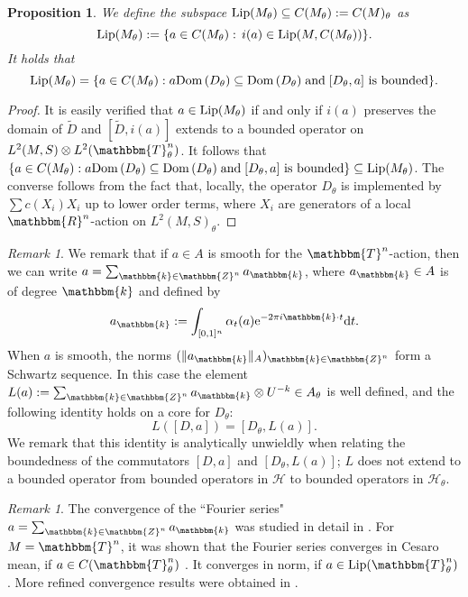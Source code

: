 \documentclass[10pt]{amsart}
\newtheorem{prop}[thm]{Proposition}
\theoremstyle{remark}
\newtheorem{remark}[thm]{Remark}
\theoremstyle{definition}
\begin{document}
\begin{prop}
We define the subspace ${\textnormal{Lip}}(M_\theta)\subseteq C(M_\theta):=C(M)_\theta$ as 
$${\textnormal{Lip}}(M_\theta):=\{a\in C(M_\theta): \,i(a)\in {\textnormal{Lip}}(M,C(M_\theta))\}.$$
It holds that 
$${\textnormal{Lip}}(M_\theta)=\{a\in C(M_\theta):a{\mathrm{Dom}\,}(D_\theta)\subseteq {\mathrm{Dom}\,}(D_\theta)\;\mbox{and} \; [D_\theta,a]\mbox{ is bounded}\}.$$
\end{prop}

\begin{proof}
It is easily verified that $a\in {\textnormal{Lip}}(M_\theta)$ if and only if $i(a)$ preserves the domain of $\tilde{D}$ and $[\tilde{D},i(a)]$ extends to a bounded operator on $L^2(M,S)\otimes L^2({\mathbbm{T}}^n_\theta)$. It follows that $\{a\in C(M_\theta):a{\mathrm{Dom}\,}(D_\theta)\subseteq {\mathrm{Dom}\,}(D_\theta)\;\mbox{and} \; [D_\theta,a]\mbox{ is bounded}\}\subseteq {\textnormal{Lip}}(M_\theta)$. The converse follows from the fact that,  locally, the operator $D_\theta$ is implemented by $\sum c(X_i)X_i$ up to lower order terms, where $X_i$ are generators of a local ${\mathbbm{R}}^n$-action on $L^2(M,S)_\theta$. 
\end{proof}

\begin{remark}
\label{thelmapping}
We remark that if $a\in A$ is smooth for the ${\mathbbm{T}}^n$-action, then we can write $a=\sum_{\mathbbm{k}\in {\mathbbm{Z}}^n} a_\mathbbm{k}$, where $a_\mathbbm{k}\in A$ is of degree $\mathbbm{k}$ and defined by 
$$a_\mathbbm{k}:=\int_{[0,1]^n} \alpha_t(a){\mathrm{e}}^{-2\pi i\mathbbm{k}\cdot t}{\mathrm{d}} t.$$
When $a$ is smooth, the norms $(\|a_\mathbbm{k}\|_A)_{\mathbbm{k}\in {\mathbbm{Z}}^n}$ form a Schwartz sequence. In this case the element $L(a):=\sum_{\mathbbm{k}\in {\mathbbm{Z}}^n} a_\mathbbm{k}\otimes U^{-k}\in A_\theta$ is well defined, and the following identity holds on a core for $D_\theta$:
$$L([D,a])=[D_\theta,L(a)].$$
We remark that this identity is analytically unwieldly when relating the boundedness of the commutators $[D,a]$ and $[D_\theta,L(a)]$; $L$ does not extend to a bounded operator from bounded operators in ${\mathcal{H}}$ to bounded operators in ${\mathcal{H}}_\theta$.
\end{remark}

\begin{remark}
The convergence of the ``Fourier series"  $a=\sum_{\mathbbm{k}\in {\mathbbm{Z}}^n} a_\mathbbm{k}$ was studied in detail in \cite{weaverlip}. For $M={\mathbbm{T}}^n$, it was shown that the Fourier series converges in Cesaro mean, if $a\in C({\mathbbm{T}}^n_\theta)$ \cite[Theorem 22]{weaverlip}. It converges in norm, if $a\in {\textnormal{Lip}}({\mathbbm{T}}^n_\theta)$ \cite[Theorem 23]{weaverlip}. More refined convergence results were obtained in \cite{xiongxuyinfirst}.
\end{remark}
\end{document}
